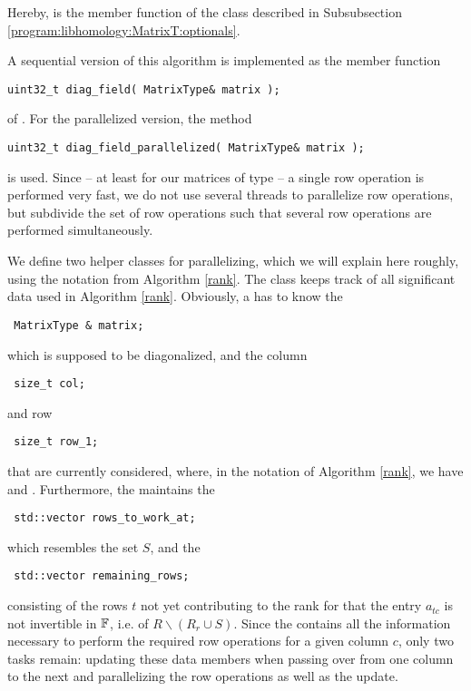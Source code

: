 Hereby,  is the member function of the class  described in Subsubsection
\ref{program:libhomology:MatrixT:optionals}.

A sequential version of this algorithm is implemented as the member function
\begin{lstlisting}
uint32_t diag_field( MatrixType& matrix );
\end{lstlisting}
of .
For the parallelized version, the method
\begin{lstlisting}
uint32_t diag_field_parallelized( MatrixType& matrix );
\end{lstlisting}
is used.
Since -- at least for our matrices of type  -- a single row operation is performed very fast,
we do not use several threads to parallelize row operations, 
but subdivide the set of row operations such that several row operations are performed simultaneously.

We define two helper classes for parallelizing, which we will explain here roughly,
using the notation from Algorithm \ref{rank}.
The class  keeps track of all significant data used in Algorithm \ref{rank}.
Obviously, a  has to know the
\begin{lstlisting}
 MatrixType & matrix;
\end{lstlisting}
which is supposed to be diagonalized, and the column 
\begin{lstlisting}
 size_t col;
\end{lstlisting}
and row
\begin{lstlisting}
 size_t row_1;
\end{lstlisting}
that are currently considered, where, in the notation of Algorithm \ref{rank}, we have  and . 
Furthermore, the  maintains the 
\begin{lstlisting}
 std::vector rows_to_work_at;
\end{lstlisting}
which resembles the set $S$, and the
\begin{lstlisting}
 std::vector remaining_rows;
\end{lstlisting}
consisting of the rows $t$ not yet contributing to the rank for that the entry $a_{tc}$ is not invertible in $\mathbb F$, i.e. of $R\backslash (R_r \cup S)$.
Since the  contains all the information necessary to perform the required row operations for a given column $c$, only two tasks remain:
updating these data members when passing over from one column to the next
and parallelizing the row operations as well as the update.

